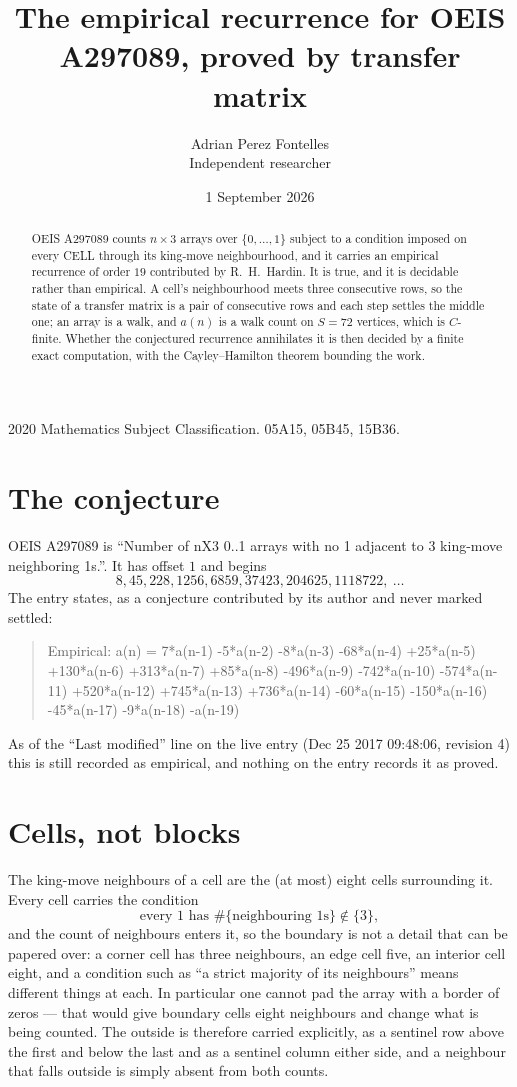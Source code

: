 \documentclass[11pt,a4paper]{article}
\title{The empirical recurrence for OEIS A297089, proved by transfer matrix}
\author{Adrian Perez Fontelles\\ \small Independent researcher}
\date{1 September 2026}
\theoremstyle{plain}
\theoremstyle{definition}
\begin{document}
\maketitle

\begin{abstract}
OEIS A297089 counts $n\times3$ arrays over $\{0,\dots,1\}$ subject to a condition imposed on
every CELL through its king-move neighbourhood, and it carries an empirical recurrence of
order $19$ contributed by R.~H.~Hardin. It is true, and it is decidable rather than
empirical. A cell's neighbourhood meets three consecutive rows, so the state of a transfer
matrix is a pair of consecutive rows and each step settles the middle one; an array is a
walk, and $a(n)$ is a walk count on $S=72$ vertices, which is $C$-finite. Whether the
conjectured recurrence annihilates it is then decided by a finite exact computation, with the
Cayley--Hamilton theorem bounding the work.
\end{abstract}

\noindent\small 2020 Mathematics Subject Classification. 05A15, 05B45, 15B36.\normalsize

\section{The conjecture}

OEIS A297089 is ``Number of nX3 0..1 arrays with no 1 adjacent to 3 king-move neighboring 1s.''. It has offset $1$ and begins
\[
8, 45, 228, 1256, 6859, 37423, 204625, 1118722,\ \dots
\]
The entry states, as a conjecture contributed by its author and never marked settled:
\begin{quote}
Empirical: a(n) = 7*a(n-1) -5*a(n-2) -8*a(n-3) -68*a(n-4) +25*a(n-5) +130*a(n-6) +313*a(n-7) +85*a(n-8) -496*a(n-9) -742*a(n-10) -574*a(n-11) +520*a(n-12) +745*a(n-13) +736*a(n-14) -60*a(n-15) -150*a(n-16) -45*a(n-17) -9*a(n-18) -a(n-19)
\end{quote}
As of the ``Last modified'' line on the live entry (Dec 25 2017 09:48:06, revision 4) this is still
recorded as empirical, and nothing on the entry records it as proved.

\section{Cells, not blocks}

The king-move neighbours of a cell are the (at most) eight cells surrounding it. Every cell
carries the condition
\[
\text{every }1\text{ has }\#\{\text{neighbouring }1\text{s}\}\notin\{3\},
\]
and the count of neighbours enters it, so the boundary is not a detail that can be papered
over: a corner cell has three neighbours, an edge cell five, an interior cell eight, and a
condition such as ``a strict majority of its neighbours'' means different things at each. In
particular one cannot pad the array with a border of zeros --- that would give boundary cells
eight neighbours and change what is being counted. The outside is therefore carried
explicitly, as a sentinel row above the first and below the last and as a sentinel column
either side, and a neighbour that falls outside is simply absent from both counts.
\end{document}
